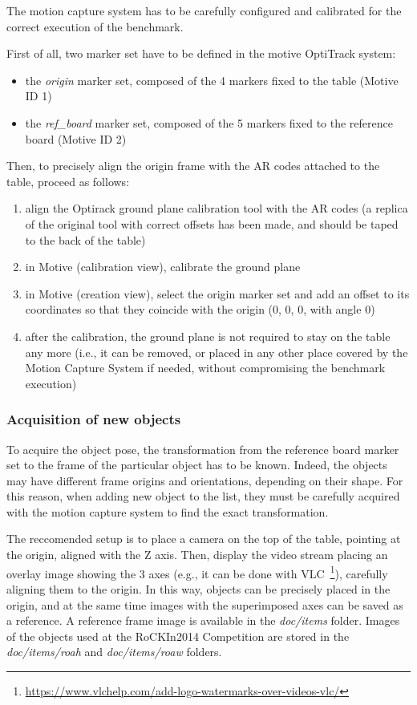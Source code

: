 \documentclass[a4paper]{article}
\newcommand{\ro}{RoCKIn}
\begin{document}
The motion capture system has to be carefully configured and calibrated for the correct execution of the benchmark.

First of all, two marker set have to be defined in the motive OptiTrack system:
\begin{itemize}
  \item the \emph{origin} marker set, composed of the 4 markers fixed to the table (Motive ID 1)
  \item the \emph{ref\_board} marker set, composed of the 5 markers fixed to the reference board (Motive ID 2)
\end{itemize}

Then, to precisely align the origin frame with the AR codes attached to the table, proceed as follows:
\begin{enumerate}
  \item align the Optirack ground plane calibration tool with the AR codes (a replica of the original tool with correct offsets has been made, and should be taped to the back of the table)
  \item in Motive (calibration view), calibrate the ground plane
  \item in Motive (creation view), select the origin marker set and add an offset to its coordinates so that they coincide with the origin (0, 0, 0, with angle 0)
  \item after the calibration, the ground plane is not required to stay on the table any more (i.e., it can be removed, or placed in any other place covered by the Motion Capture System if needed, without compromising the benchmark execution)
  
\end{enumerate}

\subsubsection{Acquisition of new objects}
\label{sec:acquire_items}

To acquire the object pose, the transformation from the reference board marker set to the frame of the particular object has to be known.
Indeed, the objects may have different frame origins and orientations, depending on their shape.
For this reason, when adding new object to the list, they must be carefully acquired with the motion capture system to find the exact transformation.

The reccomended setup is to place a camera on the top of the table, pointing at the origin, aligned with the Z axis.
Then, display the video stream placing an overlay image showing the 3 axes (e.g., it can be done with VLC~\footnote{\url{https://www.vlchelp.com/add-logo-watermarks-over-videos-vlc/}}), carefully aligning them to the origin.
In this way, objects can be precisely placed in the origin, and at the same time images with the superimposed axes can be saved as a reference.
A reference frame image is available in the \emph{doc/items} folder.
Images of the objects used at the \ro 2014 Competition are stored in the \emph{doc/items/roah} and \emph{doc/items/roaw} folders.
\end{document}
